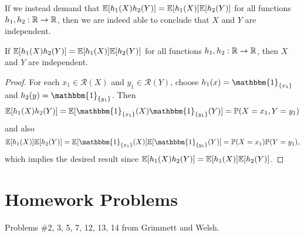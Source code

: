\begin{remark}
  If we instead demand that
  $\mathbb{E}[h_1(X)h_2(Y)] = \mathbb{E}[h_1(X)] \mathbb{E}[h_2(Y)]$
  for all functions $h_1, h_2 : \mathbb{R} \to \mathbb{R}$,
  then we are indeed able to conclude that
  $X$ and $Y$ are independent.
\end{remark}

\begin{prop}
  If $\mathbb{E}[h_1(X)h_2(Y)] = \mathbb{E}[h_1(X)] \mathbb{E}[h_2(Y)]$
  for all functions $h_1, h_2 : \mathbb{R} \to \mathbb{R}$, then $X$ and $Y$
  are independent.
\end{prop}

\begin{proof}
  For each $x_1 \in \mathcal{R}(X)$ and $y_1 \in \mathcal{R}(Y)$,
  choose $h_1(x) = \mathbbm{1}_{\{x_1\}}$
  and $h_2(y) = \mathbbm{1}_{\{y_1\}}$. Then
  \[
    \EE[h_1(X)h_2(Y)] = \EE[\mathbbm{1}_{\{x_1\}}(X) \mathbbm{1}_{\{y_1\}}(Y)]
    = \PP(X = x_1, Y = y_1)
  \]
  and also
  \[
    \EE[h_1(X)] \EE[h_2(Y)]
    = \EE[\mathbbm{1}_{\{x_1\}}(X)] \EE[\mathbbm{1}_{\{y_1\}}(Y)]
    = \PP(X = x_1) \PP(Y = y_1),
  \]
  which implies the desired result since
  $\mathbb{E}[h_1(X)h_2(Y)] = \mathbb{E}[h_1(X)] \mathbb{E}[h_2(Y)]$.
\end{proof}

\section{Homework Problems}
Problems \#2, 3, 5, 7, 12, 13, 14 from
Grimmett and Welsh.
